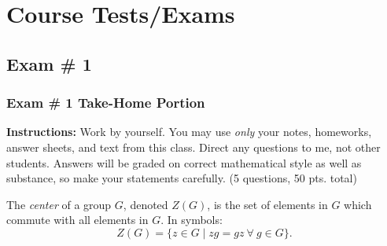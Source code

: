 \setcounter{chapter}{19}
\chapter*{Course Tests/Exams}
\addtocounter{chapter}{1} %
\setcounter{section}{0}

\section{Exam \# 1 }
\subsection{Exam \# 1 Take-Home Portion}
\noindent\textbf{Instructions:} Work by yourself. You may use \textit{only} your notes, homeworks, answer sheets, and text from this class. Direct any questions to me, not other students. Answers will be graded on correct mathematical style as well as substance, so make your statements carefully. (5 questions, 50 pts. total)

\begin{definition}
The \textit{center} of a group \( G \), denoted \( Z(G) \), is the set of elements in \( G \) which commute with all elements in \( G \). In symbols:
\[
Z(G) = \{ z \in G \mid zg = gz \ \forall \ g \in G \}.
\]
\end{definition}

